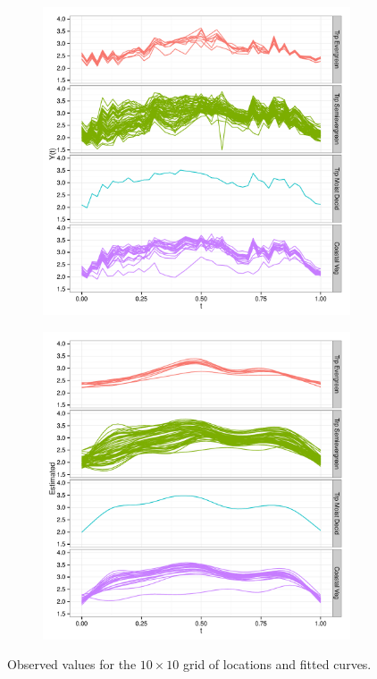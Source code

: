 \begin{figure}
	\centering 
	\begin{subfigure}
		[b]{0.5 
		\textwidth} \centering 
		\includegraphics[width= 
		\textwidth]{Images-future-work/region6-curves-facet.pdf} 
	\end{subfigure}
	
	\begin{subfigure}
		[b]{0.5 
		\textwidth} \centering 
		\includegraphics[width= 
		\textwidth]{Images-future-work/region6-estimated-curves-facet.pdf} 
	\end{subfigure}
	\caption{Observed values for the $10\times 10$ grid of locations and fitted curves.} \label{fig:estimated curves} 
\end{figure}
